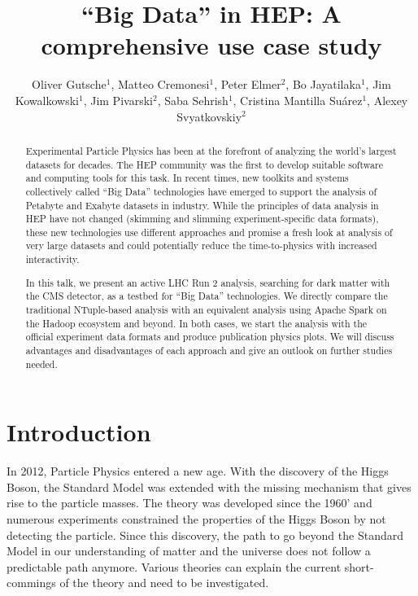 \documentclass[a4paper]{jpconf}
\begin{document}
\title{“Big Data” in HEP: A comprehensive use case study}

\author{Oliver Gutsche$^1$, Matteo Cremonesi$^1$, Peter Elmer$^2$, Bo Jayatilaka$^1$, Jim Kowalkowski$^1$, Jim Pivarski$^2$, Saba Sehrish$^1$, Cristina Mantilla Suárez$^1$, Alexey Svyatkovskiy$^2$}

\address{$^1$Fermi National Accelerator Laboratory, Batavia, IL, USA}
\address{$^2$Princeton University, Princeton, NJ, USA}


\begin{abstract}
Experimental Particle Physics has been at the forefront of analyzing the world’s largest datasets for decades. The HEP community was the first to develop suitable software and computing tools for this task. In recent times, new toolkits and systems collectively called “Big Data” technologies have emerged to support the analysis of Petabyte and Exabyte datasets in industry. While the principles of data analysis in HEP have not changed (skimming and slimming experiment-specific data formats), these new technologies use different approaches and promise a fresh look at analysis of very large datasets and could potentially reduce the time-to-physics with increased interactivity.

In this talk, we present an active LHC Run 2 analysis, searching for dark matter with the CMS detector, as a testbed for “Big Data” technologies. We directly compare the traditional NTuple-based analysis with an equivalent analysis using Apache Spark on the Hadoop ecosystem and beyond. In both cases, we start the analysis with the official experiment data formats and produce publication physics plots. We will discuss advantages and disadvantages of each approach and give an outlook on further studies needed.
\end{abstract}

\section{Introduction}

In 2012, Particle Physics entered a new age. With the discovery of the Higgs Boson, the Standard Model was extended with the missing mechanism that gives rise to the particle masses. The theory was developed since the 1960' and numerous experiments constrained the properties of the Higgs Boson by not detecting the particle. Since this discovery, the path to go beyond the Standard Model in our understanding of matter and the universe does not follow a predictable path anymore. Various theories can explain the current short-commings of the theory and need to be investigated.
\end{document}
